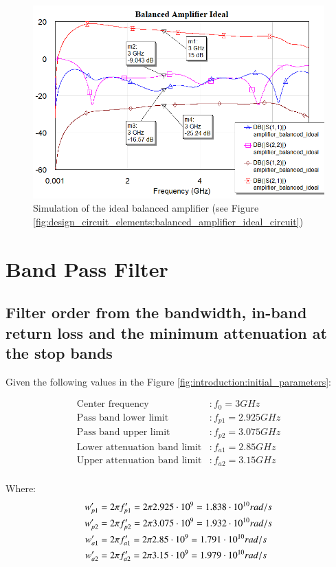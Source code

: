 \documentclass[12pt]{report} %
\begin{document}
\begin{figure}
    \centering
    \includegraphics[width=1\linewidth]{images//design_circuit_elements/balanced_amplifier_ideal_graph.png}
    \caption{Simulation of the ideal balanced amplifier (see Figure \ref{fig:design_circuit_elements:balanced_amplifier_ideal_circuit})}
    \label{fig:design_circuit_elements:balanced_amplifier_ideal_graph}
\end{figure}

\section{Band Pass Filter}

\subsection{Filter order from the bandwidth, in-band return loss and the minimum attenuation at the stop bands}

Given the following values in the Figure \ref{fig:introduction:initial_parameters}:

\begin{align*}
\text{Center frequency} & : f_0 = 3 GHz\\
\text{Pass band lower limit} & : f_{p1} = 2.925 GHz\\
\text{Pass band upper limit} & : f_{p2} = 3.075 GHz\\
\text{Lower attenuation band limit} & : f_{a1} = 2.85 GHz\\
\text{Upper attenuation band limit} & : f_{a2} = 3.15 GHz\\
\end{align*}

Where:
\begin{align*}
w'_{p1} &= 2 \* \pi \* f'_{p1} = 2 \* \pi \* 2.925 \cdot 10^9 = 1.838 \cdot 10^{10} rad/s \\
w'_{p2} &= 2 \* \pi \* f'_{p2} = 2 \* \pi \* 3.075 \cdot 10^9 = 1.932 \cdot 10^{10} rad/s \\
w'_{a1} &= 2 \* \pi \* f'_{a1} = 2 \* \pi \* 2.85 \cdot 10^9 = 1.791 \cdot 10^{10} rad/s \\
w'_{a2} &= 2 \* \pi \* f'_{a2} = 2 \* \pi \* 3.15 \cdot 10^9 = 1.979 \cdot 10^{10} rad/s \\
\end{align*}
\end{document}
